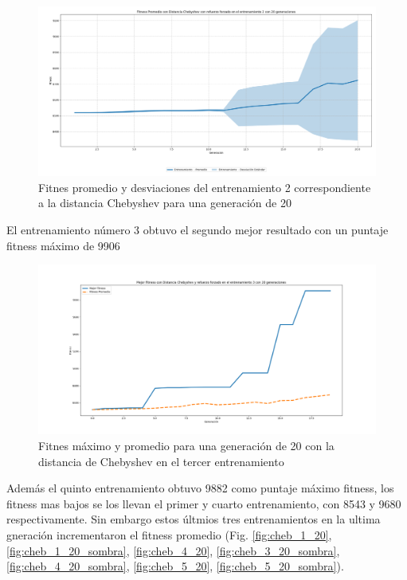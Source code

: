 \documentclass[conference]{IEEEtran}
\begin{document}
\begin{figure}[H]
    \centering
    \includegraphics[width=0.99\linewidth]{Chebyshev/Fitness_Individual_20Gen/Fitness_2_Cheby_20Gen_Sombra.png}
    \caption{Fitnes promedio y desviaciones del entrenamiento 2 correspondiente a la distancia Chebyshev para una generación de 20}
    \label{fig:ind_20_chevy}
\end{figure}
El entrenamiento número 3 obtuvo el segundo mejor resultado con un puntaje fitness máximo de 9906
\begin{figure}[H]
    \centering
    \includegraphics[width=0.99\linewidth]{Chebyshev/Fitness_Individual_20Gen/Fitness_3_Cheby_20Gen.png}
    \caption{Fitnes máximo y promedio para una generación de 20 con la distancia de Chebyshev en el tercer entrenamiento}
    \label{fig:max_cheby3_20g}
\end{figure}
Además el quinto entrenamiento obtuvo 9882 como puntaje máximo fitness, los fitness mas bajos se los llevan el primer y cuarto entrenamiento, con 8543 y 9680 respectivamente. Sin embargo estos últmios tres entrenamientos en la ultima gneración incrementaron el fitness promedio (Fig. \ref{fig:cheb_1_20}, \ref{fig:cheb_1_20_sombra}, \ref{fig:cheb_4_20},
\ref{fig:cheb_3_20_sombra},
\ref{fig:cheb_4_20_sombra}, \ref{fig:cheb_5_20}, \ref{fig:cheb_5_20_sombra}).
\end{document}

